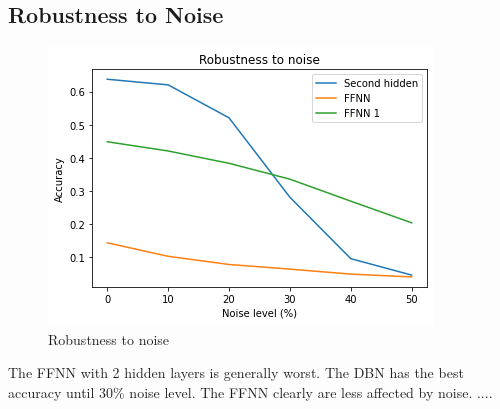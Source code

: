 \documentclass[a4paper, 11pt]{article}
\begin{document}
			
		\subsection{Robustness to Noise}	
			\begin{figure}[H]
				\centering
				\includegraphics[width=.5\linewidth]{noise2.png} %
				\caption{Robustness to noise}
				\label{fig:robNoise}
			\end{figure}
		
			The FFNN with 2 hidden layers is generally worst.
			The DBN has the best accuracy until 30\% noise level.
			The FFNN clearly are less affected by noise.
			....
		
		
		
		\printbibliography
			
\end{document}
